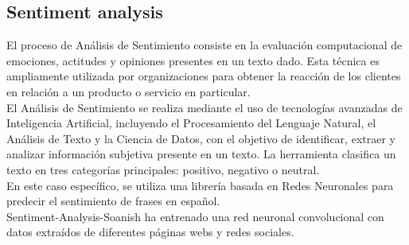 \subsection{Sentiment analysis}
El proceso de Análisis de Sentimiento \cite{analisisSentimientos} consiste en la evaluación computacional de emociones, actitudes y opiniones presentes en un texto dado. Esta técnica es ampliamente utilizada por organizaciones para obtener la reacción de los clientes en relación a un producto o servicio en particular.\\
El Análisis de Sentimiento se realiza mediante el uso de tecnologías avanzadas de Inteligencia Artificial, incluyendo el Procesamiento del Lenguaje Natural, el Análisis de Texto y la Ciencia de Datos, con el objetivo de identificar, extraer y analizar información subjetiva presente en un texto. La herramienta clasifica un texto en tres categorías principales: positivo, negativo o neutral. 
\\En este caso específico, se utiliza una librería \cite{SentimentAnalysisSpanish} basada en Redes Neuronales para predecir el sentimiento de frases en español.\\
Sentiment-Analysis-Soanish ha entrenado una red neuronal convolucional con datos extraídos de diferentes páginas webs y redes sociales.
